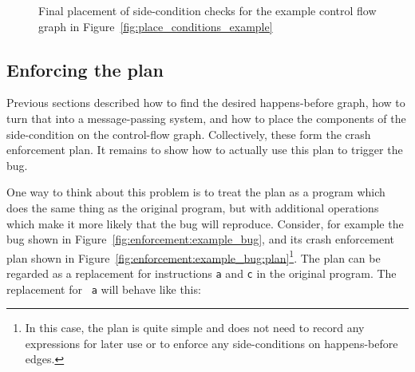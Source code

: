 \begin{figure}
  \caption{Final placement of side-condition checks for the example
    control flow graph in Figure~\ref{fig:place_conditions_example}}
  \label{fig:place_conditions_example:result}
\end{figure}


\subsection{Enforcing the plan}
\label{sect:enforce:interpreting}

Previous sections described how to find the desired happens-before
graph, how to turn that into a message-passing system, and how to
place the components of the side-condition on the control-flow graph.
Collectively, these form the crash enforcement plan.  It remains to
show how to actually use this plan to trigger the bug.

One way to think about this problem is to treat the plan as a program
which does the same thing as the original program, but with additional
operations which make it more likely that the bug will reproduce.
Consider, for example the bug shown in
Figure~\ref{fig:enforcement:example_bug}, and its crash enforcement
plan shown in
Figure~\ref{fig:enforcement:example_bug:plan}\footnote{In this case,
  the plan is quite simple and does not need to record any expressions
  for later use or to enforce any side-conditions on happens-before
  edges.}.  The plan can be regarded as a replacement for instructions
{\tt a} and {\tt c} in the original program.  The replacement for {\tt
  a} will behave like this:

